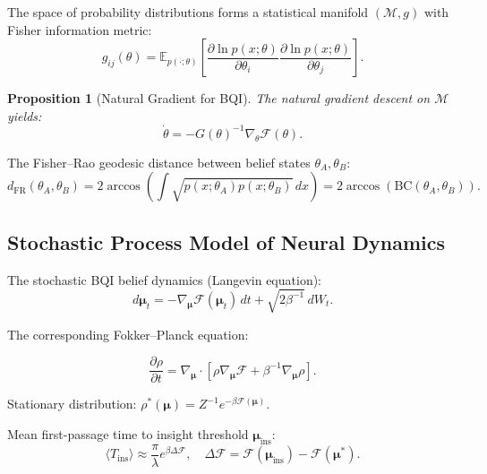 \documentclass[12pt,a4paper]{article}
\theoremstyle{plain}
\newtheorem{proposition}[theorem]{Proposition}
\theoremstyle{definition}
\theoremstyle{remark}
\newcommand{\vF}{\mathcal{F}}
\newcommand{\E}{\mathbb{E}}
\begin{document}
The space of probability distributions forms a statistical manifold $(\mathcal{M},g)$ with
Fisher information metric:
\begin{equation}
g_{ij}(\theta) = \E_{p(\cdot;\theta)}\!\left[
  \frac{\partial\ln p(x;\theta)}{\partial\theta_i}
  \frac{\partial\ln p(x;\theta)}{\partial\theta_j}\right].
\label{eq:Fisher}
\end{equation}

\begin{proposition}[Natural Gradient for BQI]
The natural gradient descent on $\mathcal{M}$ yields:
\begin{equation}
\dot{\theta} = -G(\theta)^{-1}\nabla_\theta\vF(\theta).
\label{eq:natgrad}
\end{equation}
\end{proposition}

The Fisher--Rao geodesic distance between belief states $\theta_A,\theta_B$:
\begin{equation}
d_\mathrm{FR}(\theta_A,\theta_B) = 2\arccos\!\left(\int\!\sqrt{p(x;\theta_A)p(x;\theta_B)}\,dx\right)
= 2\arccos(\mathrm{BC}(\theta_A,\theta_B)).
\label{eq:FisherRao}
\end{equation}

\subsection{Stochastic Process Model of Neural Dynamics}

The stochastic BQI belief dynamics (Langevin equation):
\begin{equation}
d\bm{\mu}_t = -\nabla_{\bm{\mu}}\vF(\bm{\mu}_t)\,dt + \sqrt{2\beta^{-1}}\,dW_t.
\label{eq:Langevin}
\end{equation}

The corresponding Fokker--Planck equation:
\begin{tcolorbox}[mathbox, title={Fokker--Planck Equation for BQI Dynamics}]
\begin{equation}
\frac{\partial\rho}{\partial t}
= \nabla_{\bm{\mu}}\cdot\!\left[\rho\nabla_{\bm{\mu}}\vF + \beta^{-1}\nabla_{\bm{\mu}}\rho\right].
\label{eq:FP}
\end{equation}
\end{tcolorbox}

Stationary distribution: $\rho^*(\bm{\mu}) = Z^{-1}e^{-\beta\vF(\bm{\mu})}$.

Mean first-passage time to insight threshold $\bm{\mu}_\mathrm{ins}$:
\begin{equation}
\langle T_\mathrm{ins}\rangle \approx \frac{\pi}{\lambda}e^{\beta\Delta\vF},\quad
\Delta\vF = \vF(\bm{\mu}_\mathrm{ins}) - \vF(\bm{\mu}^*).
\label{eq:MFPT}
\end{equation}
\end{document}
